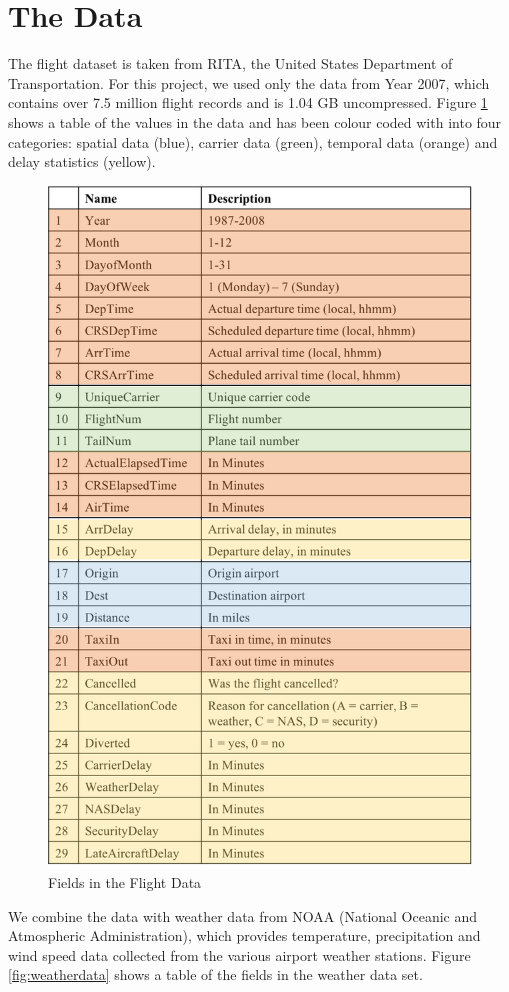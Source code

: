 \documentclass[letterpaper,11pt]{article}
\begin{document}
\section{The Data }
The flight dataset is taken from RITA, the United States Department of Transportation. For this project, we used only the data from Year 2007, which contains over 7.5 million flight records and is 1.04 GB uncompressed. Figure \ref{fig:flightdata} shows a table of the values in the data and has been colour coded with into four categories: spatial data (blue), carrier data (green), temporal data (orange) and delay statistics (yellow). 

\begin{figure}[htb]
\centering
\includegraphics[height=1.2\linewidth]{flightdata.png}
\caption{Fields in the Flight Data}
\label{fig:flightdata}
\end{figure}

We combine the data with weather data from NOAA (National Oceanic and Atmospheric Administration), which provides temperature, precipitation and wind speed data collected from the various airport weather stations. Figure \ref{fig:weatherdata} shows a table of the fields in the weather data set.\\ 
\end{document}
